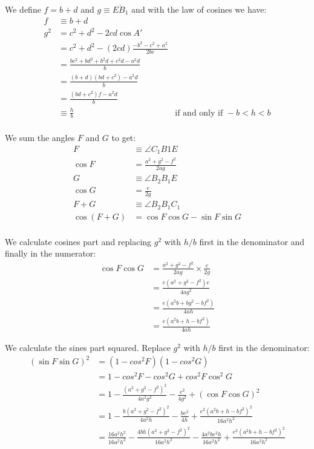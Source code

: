\documentclass[11pt]{article}
\begin{document}
We define $f=b+d$ and $g \equiv \overline{EB_1}$ and with the law of cosines we have:
\begin{align}
f &\equiv b + d\\
g^2 &= c^2 + d^2 - 2cd\cos{A'}\\
 &= c^2 + d^2 - (2cd)\frac{-b^2 - c^2 + a^2}{2bc}\\
 &= \frac{bc^2 + bd^2 + b^2d + c^2d - a^2d}{b}\\
 &= \frac{(b+d)(bd+c^2) - a^2d }{b}\\
 &= \frac{(bd+c^2)f - a^2d }{b}\\
 &\equiv \frac{h}{b} &\text{if and only if } -b < h < b\\
\end{align}

We sum the angles $F$ and $G$ to get:
\begin{align}
F &\equiv \angle{C_1B1E}\\
\cos{F} &= \frac{a^2 + g^2 - f^2}{2ag}\\
G &\equiv \angle{B_2B_1E}\\
\cos{G} &= \frac{e}{2g}\\
F+G &\equiv \angle{B_2B_1C_1}\\
\cos{(F+G)} &= \cos{F}\cos{G} - \sin{F}\sin{G}\\
\end{align}

We calculate cosines part and replacing $g^2$ with $h/b$ first in the denominator
and finally in the numerator:
\begin{align}
\cos{F}\cos{G} &= \frac{a^2 + g^2 - f^2}{2ag} \times \frac{e}{2g}\\
 &= \frac{e(a^2 + g^2 - f^2)e}{4ag^2}\\
 &= \frac{e(a^2b + bg^2 - bf^2)}{4ah}\\
 &= \frac{e(a^2b + h - bf^2)}{4ah}
\end{align}

We calculate the sines part squared. Replace $g^2$ with $h/b$ first in the denominator:
\begin{align}
(\sin{F}\sin{G})^2 &= (1 - cos^2{F})(1 - cos^2{G})\\
 &= 1 - cos^2{F} - cos^2{G} + cos^2{F}\cos^2{G}\\
 &= 1 - \frac{(a^2 + g^2 - f^2)^2}{4a^2g^2} - \frac{e^2}{4g^2} + (\cos{F}\cos{G})^2\\
 &= 1 - \frac{b(a^2 + g^2 - f^2)^2}{4a^2h} - \frac{be^2}{4h} + \frac{e^2(a^2b + h - bf^2)^2}{16a^2h^2}\\
 &= \frac{16a^2h^2}{16a^2h^2} 
 - \frac{4bh(a^2 + g^2 - f^2)^2}{16a^2h^2} 
 - \frac{4a^2be^2h}{16a^2h^2} 
 + \frac{e^2(a^2b + h - bf^2)^2}{16a^2h^2}\\
\end{align}
\end{document}
